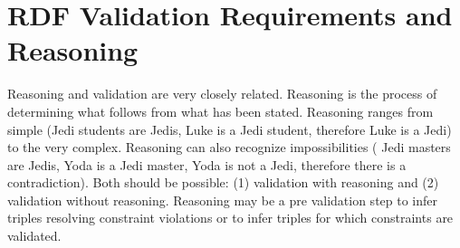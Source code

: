 \documentclass{llncs}
\newcommand{\ms}[1]{\texttt{#1}}
\newcommand{\tb}[1]{\todo[size=\small, color=green!40]{\textbf{Thomas:} #1}}
\newcommand{\er}[1]{\todo[size=\small, color=red!40]{\textbf{Erman:} #1}}
\begin{document}

\section{RDF Validation Requirements and Reasoning}
\label{sec:RDF-validation-requirements-and-reasoning}

Reasoning and validation are very closely related. 
Reasoning is the process of determining what follows from what has been
stated.  Reasoning ranges from simple (Jedi students are Jedis, Luke is a Jedi student, therefore Luke is a Jedi) to the very complex. Reasoning can
also recognize impossibilities ( Jedi masters are Jedis, Yoda is a Jedi master, Yoda
is not a Jedi, therefore there is a contradiction). 
Both should be possible: (1) validation with reasoning and (2) validation without reasoning. 
Reasoning may be a pre validation step to infer triples resolving constraint violations or to infer triples for which constraints are validated.
\end{document}
